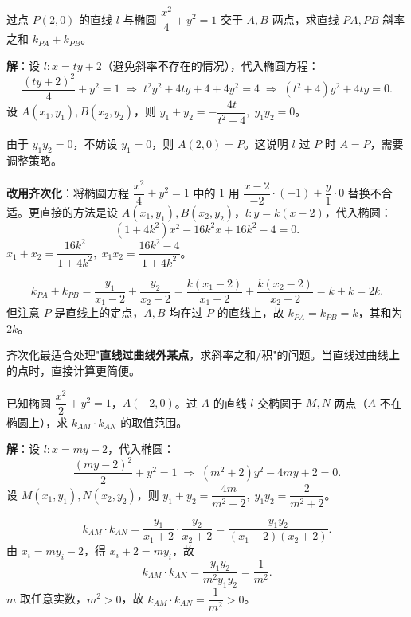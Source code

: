 \documentclass[12pt, a4paper]{ctexart}
\begin{document}
\vspace{6pt}

\begin{examplebox}[【例题3】齐次化处理斜率之和]
过点 $P(2,0)$ 的直线 $l$ 与椭圆 $\dfrac{x^2}{4}+y^2=1$ 交于 $A,B$ 两点，求直线 $PA,PB$ 斜率之和 $k_{PA}+k_{PB}$。
\end{examplebox}

\noindent\textbf{解}：设 $l:x=ty+2$（避免斜率不存在的情况），代入椭圆方程：
\[
  \frac{(ty+2)^2}{4}+y^2=1\;\Longrightarrow\;t^2y^2+4ty+4+4y^2=4\;\Longrightarrow\;(t^2+4)y^2+4ty=0.
\]
设 $A(x_1,y_1),B(x_2,y_2)$，则 $y_1+y_2=-\dfrac{4t}{t^2+4},\;y_1y_2=0$。

由于 $y_1y_2=0$，不妨设 $y_1=0$，则 $A(2,0)=P$。这说明 $l$ 过 $P$ 时 $A=P$，需要调整策略。

\noindent\textbf{改用齐次化}：将椭圆方程 $\dfrac{x^2}{4}+y^2=1$ 中的 $1$ 用 $\dfrac{x-2}{-2}\cdot(-1)+\dfrac{y}{1}\cdot0$ 替换不合适。更直接的方法是设 $A(x_1,y_1),B(x_2,y_2)$，$l:y=k(x-2)$，代入椭圆：
\[
  (1+4k^2)x^2-16k^2x+16k^2-4=0.
\]
$x_1+x_2=\dfrac{16k^2}{1+4k^2},\;x_1x_2=\dfrac{16k^2-4}{1+4k^2}$。

\[
  k_{PA}+k_{PB}=\frac{y_1}{x_1-2}+\frac{y_2}{x_2-2}=\frac{k(x_1-2)}{x_1-2}+\frac{k(x_2-2)}{x_2-2}=k+k=2k.
\]
但注意 $P$ 是直线上的定点，$A,B$ 均在过 $P$ 的直线上，故 $k_{PA}=k_{PB}=k$，其和为 $2k$。

\begin{tipbox}[齐次化的正确使用场景]
齐次化最适合处理"\textbf{直线过曲线外某点}，求斜率之和/积"的问题。当直线过曲线\textbf{上}的点时，直接计算更简便。
\end{tipbox}

\vspace{6pt}

\begin{examplebox}
已知椭圆 $\dfrac{x^2}{2}+y^2=1$，$A(-2,0)$。过 $A$ 的直线 $l$ 交椭圆于 $M,N$ 两点（$A$ 不在椭圆上），求 $k_{AM}\cdot k_{AN}$ 的取值范围。
\end{examplebox}

\noindent\textbf{解}：设 $l:x=my-2$，代入椭圆：
\[
  \frac{(my-2)^2}{2}+y^2=1\;\Longrightarrow\;(m^2+2)y^2-4my+2=0.
\]
设 $M(x_1,y_1),N(x_2,y_2)$，则 $y_1+y_2=\dfrac{4m}{m^2+2},\;y_1y_2=\dfrac{2}{m^2+2}$。

\[
  k_{AM}\cdot k_{AN}=\frac{y_1}{x_1+2}\cdot\frac{y_2}{x_2+2}=\frac{y_1y_2}{(x_1+2)(x_2+2)}.
\]
由 $x_i=my_i-2$，得 $x_i+2=my_i$，故
\[
  k_{AM}\cdot k_{AN}=\frac{y_1y_2}{m^2 y_1 y_2}=\frac{1}{m^2}.
\]
$m$ 取任意实数，$m^2>0$，故 $k_{AM}\cdot k_{AN}=\dfrac{1}{m^2}>0$。
\end{document}
